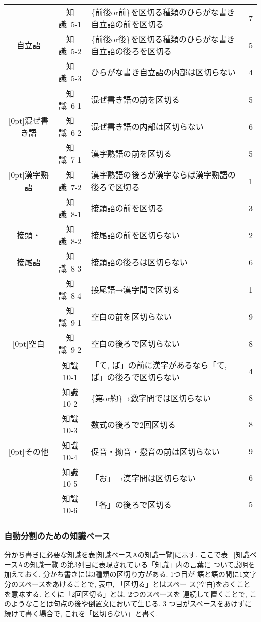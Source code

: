 \begin{table}[bt]
\begin{tabular}{|c|c|p{72ex}|c|}
	&知識~5-1 & \{前後or前\}を区切る種類のひらがな書き自立語の前を区切る 
		& 7 \\ \cline{2-4}
自立語	&知識~5-2 & \{前後or後\}を区切る種類のひらがな書き自立語の後ろを区切る 
		& 5 \\ \cline{2-4}
	&知識~5-3 & ひらがな書き自立語の内部は区切らない & 4 \\ \hline
	&知識~6-1 & 混ぜ書き語の前を区切る & 5 \\ \cline{2-4}
\raisebox{1.5ex}[0pt]{混ぜ書き語}
	&知識~6-2 & 混ぜ書き語の内部は区切らない & 6\\ \hline
	&知識~7-1 & 漢字熟語の前を区切る & 5 \\ \cline{2-4}
\raisebox{1.5ex}[0pt]{漢字熟語}
	&知識~7-2 & 漢字熟語の後ろが漢字ならば漢字熟語の後ろで区切る & 1 \\ \hline
	&知識~8-1 & 接頭語の前を区切る & 3 \\ \cline{2-4}
接頭・	&知識~8-2 & 接尾語の前を区切らない & 2 \\ \cline{2-4}
接尾語	&知識~8-3 & 接頭語の後ろは区切らない & 6 \\ \cline{2-4}
	&知識~8-4 & 接尾語→漢字間で区切る & 1 \\ \hline
	&知識~9-1 & 空白の前を区切らない & 9 \\ \cline{2-4}
\raisebox{1.5ex}[0pt]{空白}
	&知識~9-2 & 空白の後ろで区切らない & 8 \\ \hline
	& 知識10-1 &「て, ば」の前に漢字があるなら「て, ば」の後ろで区切らない 
		& 4 \\ \cline{2-4}
	&知識10-2 & \{第or約\}→数字間では区切らない & 8\\ \cline{2-4}
	&知識10-3 & 数式の後ろで2回区切る & 8\\ \cline{2-4}
\raisebox{1.5ex}[0pt]{その他}
	&知識10-4 & 促音・拗音・撥音の前は区切らない & 9 \\ \cline{2-4}
	&知識10-5 & 「お」→漢字間は区切らない & 6 \\ \cline{2-4}
	&知識10-6 & 「各」の後ろで区切る & 5 \\ \hline
\end{tabular}
\end{table}

\normalsize

\subsubsection{自動分割のための知識ベース}
分かち書きに必要な知識を表\ref{知識ベースAの知識一覧}に示す. ここで表~
\ref{知識ベースAの知識一覧}の第3列目に表現されている「知識」内の言葉に
ついて説明を加えておく. 分かち書きには3種類の区切り方がある. 1つ目が
語と語の間に1文字分のスペースをあけることで, 表中, 「区切る」とはスペー
ス(空白)をおくことを意味する. とくに「2回区切る」とは, 2つのスペースを
連続して置くことで, このようなことは句点の後や倒置文において生じる. 3
つ目がスペースをあけずに続けて書く場合で, これを「区切らない」と書く. 

